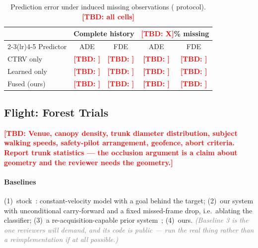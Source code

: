 \documentclass[conference]{IEEEtran}
\newcommand{\tbd}[1]{\textcolor{red}{\textbf{[TBD: #1]}}}
\newcommand{\note}[1]{\textcolor{gray}{\textit{(#1)}}}
\begin{document}
\begin{table}[t]
\centering
\caption{Prediction error under induced missing observations
(\cite{chib2024trajimpute} protocol). \tbd{all cells}}
\label{tab:prediction}
\footnotesize
\begin{tabular}{@{}lcccc@{}}
\toprule
& \multicolumn{2}{c}{Complete history} & \multicolumn{2}{c}{\tbd{X}\% missing} \\
\cmidrule(lr){2-3}\cmidrule(lr){4-5}
Predictor & ADE & FDE & ADE & FDE \\
\midrule
CTRV only                 & \tbd{} & \tbd{} & \tbd{} & \tbd{} \\
Learned only~\cite{bae2023eigentrajectory} & \tbd{} & \tbd{} & \tbd{} & \tbd{} \\
Fused (ours)              & \tbd{} & \tbd{} & \tbd{} & \tbd{} \\
\bottomrule
\end{tabular}
\end{table}

\subsection{Flight: Forest Trials}
\tbd{Venue, canopy density, trunk diameter distribution, subject walking speeds,
safety-pilot arrangement, geofence, abort criteria. Report trunk statistics ---
the occlusion argument is a claim about geometry and the reviewer needs the
geometry.}

\paragraph{Baselines} (1)~stock~\cite{ren2025super}: constant-velocity model with
a goal behind the target; (2)~our system with unconditional carry-forward and a
fixed missed-frame drop, i.e.\ ablating the classifier; (3)~a
re-acquisition-capable prior system~\cite{lin2026evatracker}; (4)~ours.
\note{Baseline 3 is the one reviewers will demand, and its code is public --- run
the real thing rather than a reimplementation if at all possible.}
\end{document}
